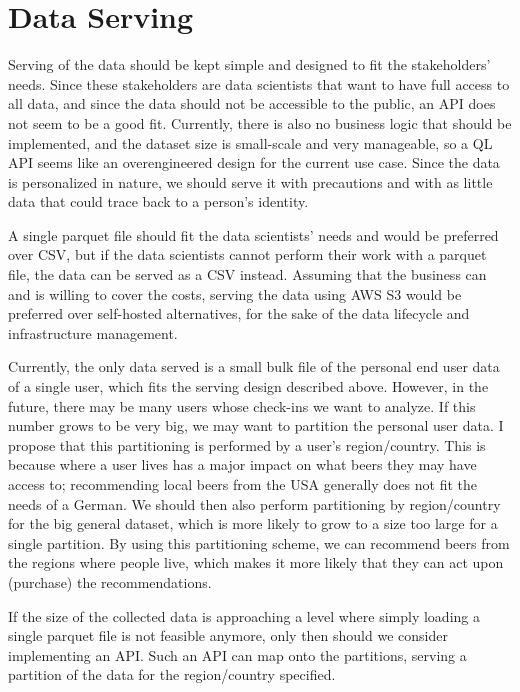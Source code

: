 \documentclass[sigconf, natbib=true]{acmart}
\begin{document}
\section{Data Serving}
Serving of the data should be kept simple and designed to fit the stakeholders' needs.
Since these stakeholders are data scientists that want to have full access to all data, and since the data should not be accessible to the public, an API does not seem to be a good fit.
Currently, there is also no business logic that should be implemented, and the dataset size is small-scale and very manageable, so a QL API seems like an overengineered design for the current use case.
Since the data is personalized in nature, we should serve it with precautions and with as little data that could trace back to a person's identity.

A single parquet file should fit the data scientists' needs and would be preferred over CSV, but if the data scientists cannot perform their work with a parquet file, the data can be served as a CSV instead.
Assuming that the business can and is willing to cover the costs, serving the data using AWS S3 would be preferred over self-hosted alternatives, for the sake of the data lifecycle and infrastructure management.

Currently, the only data served is a small bulk file of the personal end user data of a single \citeauthor{untappd} user, which fits the serving design described above.
However, in the future, there may be many users whose check-ins we want to analyze.
If this number grows to be very big, we may want to partition the personal user data.
I propose that this partitioning is performed by a user's region/country.
This is because where a user lives has a major impact on what beers they may have access to; recommending local beers from the USA generally does not fit the needs of a German.
We should then also perform partitioning by region/country for the big general dataset, which is more likely to grow to a size too large for a single partition.
By using this partitioning scheme, we can recommend beers from the regions where people live, which makes it more likely that they can act upon (purchase) the recommendations.

If the size of the collected data is approaching a level where simply loading a single parquet file is not feasible anymore, only then should we consider implementing an API.
Such an API can map onto the partitions, serving a partition of the data for the region/country specified.
\end{document}
